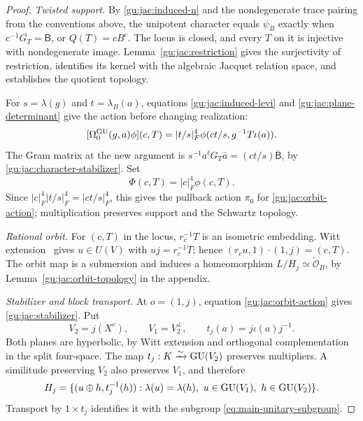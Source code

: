 \begin{proof}
\emph{Twisted support.}
By \eqref{gu:jac:induced-n} and the nondegenerate trace pairing from
the conventions above, the unipotent character equals $\psi_B$ exactly
when $c^{-1}\overline{G_T}=\mathsf B$, or $Q(T)=cB^c$.
The locus is closed, and every $T$ on it is injective with nondegenerate
image. Lemma~\ref{gu:jac:restriction} gives the surjectivity of
restriction, identifies its kernel with the algebraic Jacquet relation
space, and establishes the quotient topology.

For $s=\lambda(g)$ and $t=\lambda_B(a)$, equations
\eqref{gu:jac:induced-levi} and \eqref{gu:jac:plane-determinant} give the
action before changing realization:
\begin{equation}\label{gu:jac:quotient-action}
 [\Omega_0^{\operatorname{GU}}(g,a)\phi](c,T)
 =|t/s|_F^4\phi(ct/s,g^{-1}T\iota(a)).
\end{equation}
The Gram matrix at the new argument is
$s^{-1}a^tG_T\bar a=(ct/s)\overline{\mathsf B}$, by
\eqref{gu:jac:character-stabilizer}. Set
\begin{equation}\label{gu:jac:gauge}
 \Phi(c,T)=|c|_F^4\phi(c,T).
\end{equation}
Since $|c|_F^4|t/s|_F^4=|ct/s|_F^4$, this gives the pullback action $\pi_0$
for \eqref{gu:jac:orbit-action}; multiplication preserves support and the
Schwartz topology.

\emph{Rational orbit.}
For $(c,T)$ in the locus, $r_c^{-1}T$ is an isometric embedding.
Witt extension~\cite[Chapter~7, \S9]{Scharlau85} gives $u\in U(V)$ with $uj=r_c^{-1}T$; hence
$(r_cu,1)\cdot(1,j)=(c,T)$.
The orbit map is a submersion and induces a homeomorphism
$L/H_j\simeq\widetilde{\mathcal O}_B$, by
Lemma~\ref{gu:jac:orbit-topology} in the appendix.

\emph{Stabilizer and block transport.}
At $o=(1,j)$, equation \eqref{gu:jac:orbit-action} gives
\eqref{gu:jac:stabilizer}. Put
\begin{equation}\label{gu:jac:planes}
 V_2=j(X^c),\qquad V_1=V_2^\perp,\qquad
 t_j(a)=j\iota(a)j^{-1}.
\end{equation}
Both planes are hyperbolic, by Witt extension and orthogonal
complementation in the split four-space. The map
$t_j:K\xrightarrow{\sim}\operatorname{GU}(V_2)$ preserves multipliers.
A similitude preserving $V_2$ also preserves $V_1$, and therefore
\begin{equation}\label{gu:jac:block-stabilizer}
 H_j=\{(u\oplus h,t_j^{-1}(h)):
       \lambda(u)=\lambda(h),\ u\in\operatorname{GU}(V_1),\ h\in\operatorname{GU}(V_2)\}.
\end{equation}
Transport by $1\times t_j$ identifies it with the subgroup
\eqref{eq:main-unitary-subgroup}.


\end{proof}
